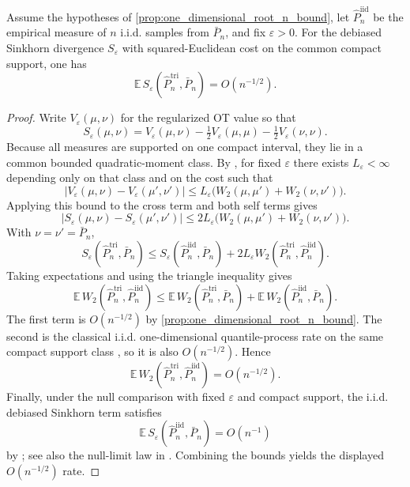 \begin{proposition}
\label{prop:pointwise_sinkhorn_1d}
Assume the hypotheses of \cref{prop:one_dimensional_root_n_bound}, let
$\widehat P_n^{\mathrm{iid}}$ be the empirical measure of $n$ i.i.d. samples from
$\bar P_n$, and fix $\varepsilon>0$. For the debiased Sinkhorn divergence
$S_{\varepsilon}$ with squared-Euclidean cost on the common compact support,
one has
\[
  \mathbb E\,S_{\varepsilon}\!\left(\widehat P_n^{\mathrm{tri}},\bar P_n\right)
  = O(n^{-1/2}).
\]
\end{proposition}

\begin{proof}
Write $V_{\varepsilon}(\mu,\nu)$ for the regularized OT value so that
\[
  S_{\varepsilon}(\mu,\nu)
  = V_{\varepsilon}(\mu,\nu)
  - \tfrac12 V_{\varepsilon}(\mu,\mu)
  - \tfrac12 V_{\varepsilon}(\nu,\nu).
\]
Because all measures are supported on one compact interval, they lie in a
common bounded quadratic-moment class. By \citet[Thm.~3.7(ii), Ex.~3.4]{EcksteinNutz2022},
for fixed $\varepsilon$ there exists $L_{\varepsilon}<\infty$ depending only on
that class and on the cost such that
\[
  |V_{\varepsilon}(\mu,\nu)-V_{\varepsilon}(\mu',\nu')|
  \le L_{\varepsilon}\bigl(W_2(\mu,\mu')+W_2(\nu,\nu')\bigr).
\]
Applying this bound to the cross term and both self terms gives
\[
  |S_{\varepsilon}(\mu,\nu)-S_{\varepsilon}(\mu',\nu')|
  \le 2L_{\varepsilon}\bigl(W_2(\mu,\mu')+W_2(\nu,\nu')\bigr).
\]
With $\nu=\nu'=\bar P_n$,
\[
  S_{\varepsilon}\!\left(\widehat P_n^{\mathrm{tri}},\bar P_n\right)
  \le
  S_{\varepsilon}\!\left(\widehat P_n^{\mathrm{iid}},\bar P_n\right)
  + 2L_{\varepsilon}
    W_2\!\left(\widehat P_n^{\mathrm{tri}},\widehat P_n^{\mathrm{iid}}\right).
\]
Taking expectations and using the triangle inequality gives
\[
  \mathbb E\,W_2\!\left(\widehat P_n^{\mathrm{tri}},\widehat P_n^{\mathrm{iid}}\right)
  \le
  \mathbb E\,W_2\!\left(\widehat P_n^{\mathrm{tri}},\bar P_n\right)
  + \mathbb E\,W_2\!\left(\widehat P_n^{\mathrm{iid}},\bar P_n\right).
\]
The first term is $O(n^{-1/2})$ by \cref{prop:one_dimensional_root_n_bound}. The second is
the classical i.i.d. one-dimensional quantile-process rate on the same compact
support class \citep{Bahadur1966,vanDerVaart1998}, so it is also
$O(n^{-1/2})$. Hence
\[
  \mathbb E\,W_2\!\left(\widehat P_n^{\mathrm{tri}},\widehat P_n^{\mathrm{iid}}\right)
  = O(n^{-1/2}).
\]
Finally, under the null comparison with fixed $\varepsilon$ and compact support,
the i.i.d. debiased Sinkhorn term satisfies
\[
  \mathbb E\,S_{\varepsilon}\!\left(\widehat P_n^{\mathrm{iid}},\bar P_n\right)
  = O(n^{-1})
\]
by \citet[Thm.~5.1, after fixed-$\varepsilon$ rescaling]{delBarrioEtAl2023}; see also the null-limit law in
\citet{GoldfeldEtAl2022}. Combining the bounds yields the displayed
$O(n^{-1/2})$ rate.
\end{proof}


